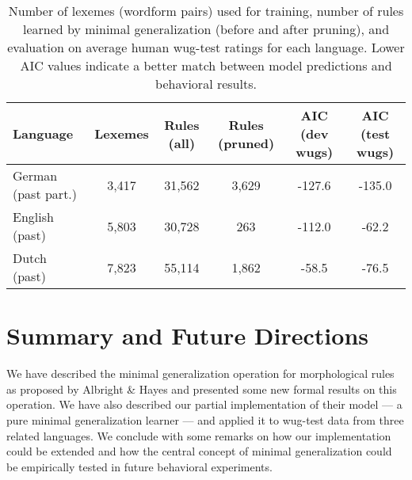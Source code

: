 \documentclass[11pt]{article}
\begin{document}
\begin{table*}
  \centering
  \begin{tabular}{l c c c c c}
    \hline
    Language  & Lexemes & Rules (all) & Rules (pruned) & 
    AIC (dev wugs) & AIC (test wugs) \\
    \hline
    German (past part.) & 3,417 & 31,562 & 3,629 & -127.6 & -135.0\\
    English (past) & 5,803 & 30,728 & 263 & -112.0 & -62.2\\
    Dutch (past) & 7,823 & 55,114 & 1,862 & -58.5 & -76.5\\
    \hline
  \end{tabular}
\caption{\label{results}Number of lexemes (wordform pairs) used for training, number of rules learned by minimal generalization (before and after pruning), and evaluation on average human wug-test ratings for each language. Lower AIC values indicate a better match between model predictions and behavioral results.}
\end{table*}






\section{Summary and Future Directions}
\label{sec:summary}

We have described the minimal generalization operation for morphological rules as proposed by Albright \& Hayes and presented some new formal results on this operation. We have also described our partial implementation of their model --- a pure minimal generalization learner --- and applied it to wug-test data from three related languages. We conclude with some remarks on how our implementation could be extended and how the central concept of minimal generalization could be empirically tested in future behavioral experiments.
\end{document}
